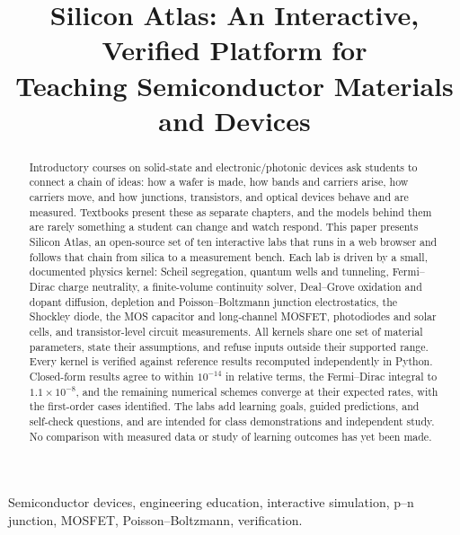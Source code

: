 \documentclass[conference]{IEEEtran}
\begin{document}
\title{Silicon Atlas: An Interactive, Verified Platform for\\Teaching Semiconductor Materials and Devices}

\author{
}

\maketitle

\begin{abstract}
Introductory courses on solid-state and electronic/photonic devices ask students to connect a chain of ideas: how a wafer is made, how bands and carriers arise, how carriers move, and how junctions, transistors, and optical devices behave and are measured. Textbooks present these as separate chapters, and the models behind them are rarely something a student can change and watch respond. This paper presents Silicon Atlas, an open-source set of ten interactive labs that runs in a web browser and follows that chain from silica to a measurement bench. Each lab is driven by a small, documented physics kernel: Scheil segregation, quantum wells and tunneling, Fermi--Dirac charge neutrality, a finite-volume continuity solver, Deal--Grove oxidation and dopant diffusion, depletion and Poisson--Boltzmann junction electrostatics, the Shockley diode, the MOS capacitor and long-channel MOSFET, photodiodes and solar cells, and transistor-level circuit measurements. All kernels share one set of material parameters, state their assumptions, and refuse inputs outside their supported range. Every kernel is verified against reference results recomputed independently in Python. Closed-form results agree to within $10^{-14}$ in relative terms, the Fermi--Dirac integral to $1.1\times10^{-8}$, and the remaining numerical schemes converge at their expected rates, with the first-order cases identified. The labs add learning goals, guided predictions, and self-check questions, and are intended for class demonstrations and independent study. No comparison with measured data or study of learning outcomes has yet been made.
\end{abstract}

\begin{IEEEkeywords}
Semiconductor devices, engineering education, interactive simulation, p--n junction, MOSFET, Poisson--Boltzmann, verification.
\end{IEEEkeywords}
\end{document}
